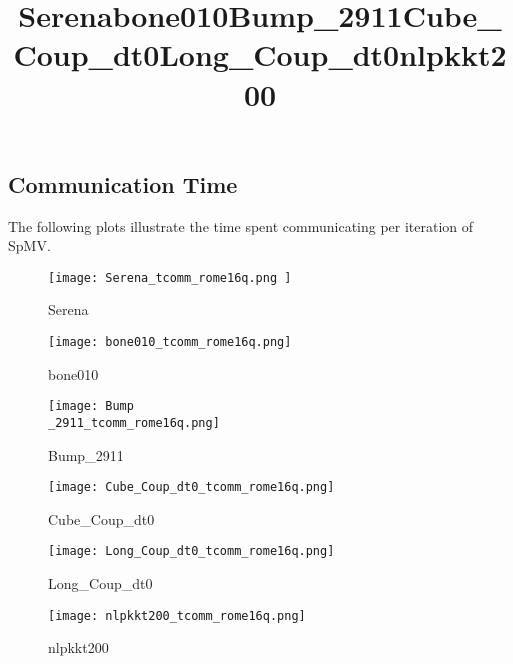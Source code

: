 \subsection{Communication Time \romeq}
The following plots illustrate the time spent communicating per iteration of SpMV.

\begin{figure}[H]
    \title{Serena}
    \begin{center}
        \texttt{[image: Serena\_tcomm\_rome16q.png ]}
    \end{center}
    \caption{Serena}
    \label{fig:Serena_tcomm_rome16q.png}
\end{figure}

\begin{figure}[H]
    \title{bone010}
    \begin{center}
        \texttt{[image: bone010\_tcomm\_rome16q.png]}
    \end{center}
    \caption{bone010}
    \label{fig:bone010_tcomm_rome16q.png}
\end{figure}

\begin{figure}[H]
    \title{Bump\_2911}
    \begin{center}
        \texttt{[image: Bump\\\_2911\_tcomm\_rome16q.png]}
    \end{center}
    \caption{Bump\_2911}
    \label{fig:Bump_2911_rome16q_tcomm_single.png}
\end{figure}

\begin{figure}[H]
    \title{Cube\_Coup\_dt0}
    \begin{center}
        \texttt{[image: Cube\_Coup\_dt0\_tcomm\_rome16q.png]}
    \end{center}
    \caption{Cube\_Coup\_dt0}
    \label{fig:Cube_Coup_dt0_tcomm_rome16q.png}
\end{figure}

\begin{figure}[H]
    \title{Long\_Coup\_dt0}
    \begin{center}
        \texttt{[image: Long\_Coup\_dt0\_tcomm\_rome16q.png]}
    \end{center}
    \caption{Long\_Coup\_dt0}
    \label{fig:Long_Coup_dt0_tcomm_rome16q.png}
\end{figure}

\begin{figure}[H]
    \title{nlpkkt200}
    \begin{center}
        \texttt{[image: nlpkkt200\_tcomm\_rome16q.png]}
    \end{center}
    \caption{nlpkkt200}
    \label{fig:nlpkkt200_rome16q_tcomm_single.png}
\end{figure}

